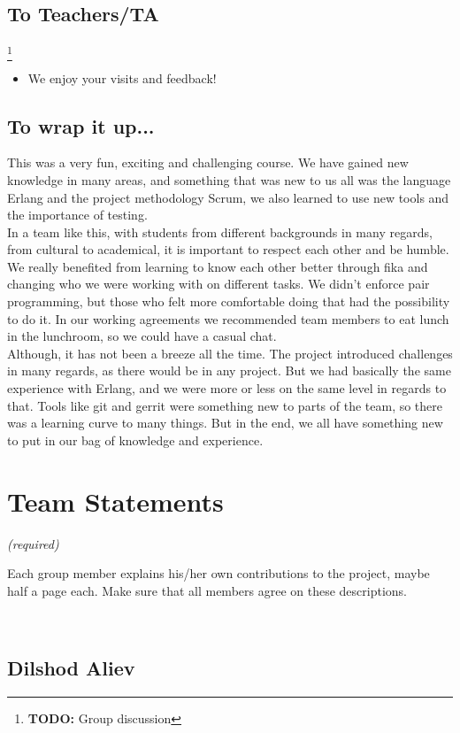 \documentclass[11pt,a4paper]{report}
\newcommand{\hi}[1]{{\color{red}\tiny \em #1\/}\\}
\newcommand{\todo}[1]{\footnote{{\color{red} {\bf TODO:} #1}}}
\begin{document}
\section*{To Teachers/TA}
\todo{Group discussion}
\begin{itemize}
\item We enjoy your visits and feedback!
\end{itemize}

\section*{To wrap it up...}
This was a very fun, exciting and challenging course. We have gained new
knowledge in many areas, and something that was new to us all was the
language Erlang and the project methodology Scrum, we also learned to
use new tools and the importance of testing.\\

In a team like this, with students from different backgrounds in many regards,
from cultural to academical, it is important to respect each other and be humble.
We really benefited from learning to know each other better through fika and
changing who we were working with on different tasks. We didn't enforce
pair programming, but those who felt more comfortable doing that had the
possibility to do it. In our working agreements we recommended team members to
eat lunch in the lunchroom, so we could have a casual chat.\\

Although, it has not been a breeze all the time. The project introduced 
challenges in many regards, as there would be in any project.
But we had basically the same experience with Erlang, and we were more or less
on the same level in regards to that. Tools like git and gerrit were something
new to parts of the team, so there was a learning curve to many things. But in
the end, we all have something new to put in our bag of knowledge and experience.
\appendix

\chapter{Team Statements}
\hi{ (required)

Each group member explains his/her own contributions to the project, maybe half a page each. Make sure that all members agree on these descriptions.}
\section{Dilshod Aliev}
\end{document}
